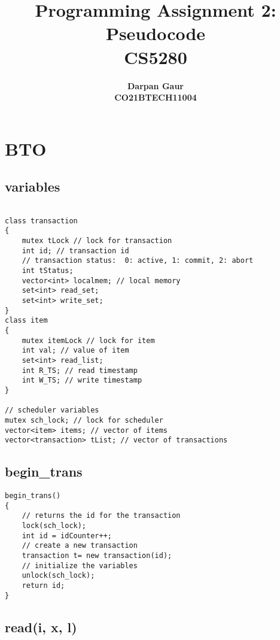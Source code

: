\documentclass[12pt]{article}
\title{
    \textbf{Programming Assignment 2: Pseudocode} \\ 
    \textbf{CS5280} \\
}
\author{
    \textbf{Darpan Gaur} \\
    \textbf{CO21BTECH11004}
}
\date{}
\begin{document}
\maketitle

\hrulefill

\section*{BTO}

\subsection*{variables}
\begin{lstlisting}

class transaction
{
    mutex tLock // lock for transaction
    int id; // transaction id
    // transaction status:  0: active, 1: commit, 2: abort
    int tStatus; 
    vector<int> localmem; // local memory
    set<int> read_set;
    set<int> write_set;
}
class item
{
    mutex itemLock // lock for item
    int val; // value of item
    set<int> read_list;
    int R_TS; // read timestamp
    int W_TS; // write timestamp
}

// scheduler variables
mutex sch_lock; // lock for scheduler
vector<item> items; // vector of items
vector<transaction> tList; // vector of transactions

\end{lstlisting}

\subsection*{begin\_trans}

\begin{lstlisting}
begin_trans()
{
    // returns the id for the transaction
    lock(sch_lock);
    int id = idCounter++;
    // create a new transaction
    transaction t= new transaction(id);
    // initialize the variables
    unlock(sch_lock);
    return id;
}
\end{lstlisting}

\subsection*{read(i, x, l)}
\end{document}
